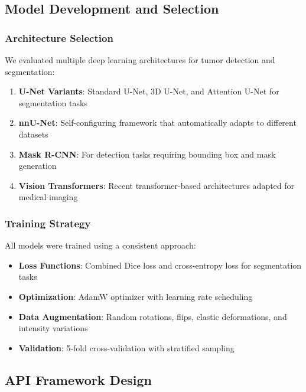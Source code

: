 \documentclass[12pt,a4paper]{article}
\begin{document}
\subsection{Model Development and Selection}

\subsubsection{Architecture Selection}

We evaluated multiple deep learning architectures for tumor detection and segmentation:

\begin{enumerate}
    \item \textbf{U-Net Variants}: Standard U-Net, 3D U-Net, and Attention U-Net for segmentation tasks
    \item \textbf{nnU-Net}: Self-configuring framework that automatically adapts to different datasets \cite{isensee2021nnunet}
    \item \textbf{Mask R-CNN}: For detection tasks requiring bounding box and mask generation
    \item \textbf{Vision Transformers}: Recent transformer-based architectures adapted for medical imaging
\end{enumerate}

\subsubsection{Training Strategy}

All models were trained using a consistent approach:

\begin{itemize}
    \item \textbf{Loss Functions}: Combined Dice loss and cross-entropy loss for segmentation tasks
    \item \textbf{Optimization}: AdamW optimizer with learning rate scheduling
    \item \textbf{Data Augmentation}: Random rotations, flips, elastic deformations, and intensity variations
    \item \textbf{Validation}: 5-fold cross-validation with stratified sampling
\end{itemize}

\subsection{API Framework Design}
\end{document}
